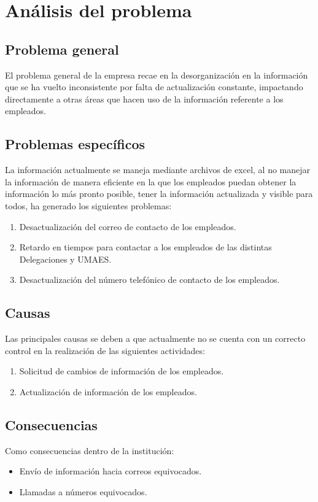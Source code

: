 \section{Análisis del problema}

\subsection{Problema general}
El problema general de la empresa recae en la desorganización en la información que se ha vuelto inconsistente por falta de actualización constante, impactando directamente a otras áreas que hacen uso de la información referente a los empleados.

\subsection{Problemas específicos}
La información actualmente se maneja mediante archivos de excel, al no manejar la información de manera eficiente en la que los empleados puedan obtener la información lo más pronto posible, tener la información actualizada y visible para todos, ha generado los siguientes problemas:

\begin{enumerate}
    \item Desactualización del correo de contacto de los empleados.
    \item Retardo en tiempos para contactar a los empleados de las distintas Delegaciones y UMAES.
    \item Desactualización del número telefónico de contacto de los empleados.
\end{enumerate}

\subsection{Causas}
Las principales causas se deben a que actualmente no se cuenta con un correcto control en la realización de las siguientes actividades:
\begin{enumerate}
    \item Solicitud de cambios de información de los empleados.
    \item Actualización de información de los empleados.
\end{enumerate}

\subsection{Consecuencias}
Como consecuencias dentro de la institución:
\begin{itemize}
    \item Envío de información hacia correos equivocados.
    \item Llamadas a números equivocados.
\end{itemize}

